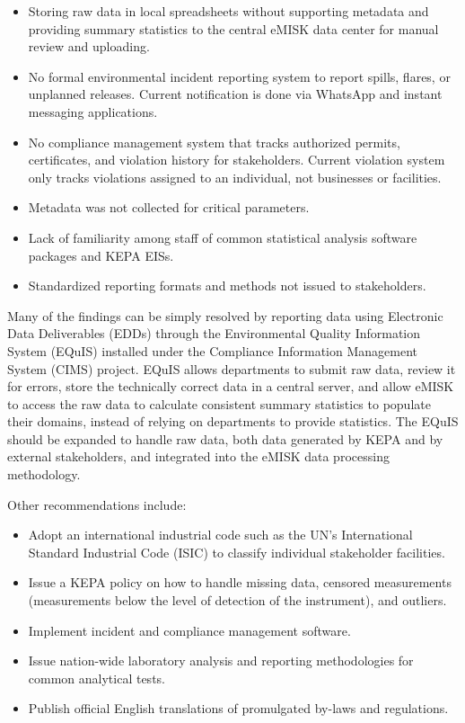 \begin{itemize}

\item Storing raw data in local spreadsheets without supporting metadata and providing summary statistics to the central eMISK data center for manual review and uploading.
\item No formal environmental incident reporting system to report spills, flares, or unplanned releases. Current notification is done via WhatsApp and instant messaging applications. 
\item No compliance management system that tracks authorized permits, certificates, and violation history for stakeholders. Current violation system only tracks violations assigned to an individual, not businesses or facilities.
\item Metadata was not collected for critical parameters.
\item Lack of familiarity among staff of common statistical analysis software packages and KEPA EISs. 
\item Standardized reporting formats and methods not issued to stakeholders.
\end{itemize}

Many of the findings can be simply resolved by reporting data using Electronic Data Deliverables (EDDs) through the Environmental Quality Information System (EQuIS) installed under the Compliance Information Management System (CIMS) project. EQuIS allows departments to submit raw data, review it for errors, store the technically correct data in a central server, and allow eMISK to access the raw data to calculate consistent summary statistics to populate their domains, instead of relying on departments to provide statistics. The EQuIS should be expanded to handle raw data, both data generated by KEPA and by external stakeholders, and integrated into the eMISK data processing methodology.

Other recommendations include:

\begin{itemize}
\item Adopt an international industrial code such as the UN's International Standard Industrial Code (ISIC) to classify individual stakeholder facilities.
\item Issue a KEPA policy on how to handle missing data, censored measurements (measurements below the level of detection of the instrument), and outliers.
\item Implement incident and compliance management software.
\item Issue nation-wide laboratory analysis and reporting methodologies for common analytical tests.
\item Publish official English translations of promulgated by-laws and regulations.

\end{itemize}

\clearpage


